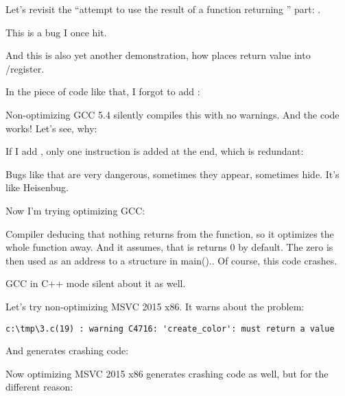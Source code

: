 \label{ForgottenReturn}

Let's revisit the ``attempt to use the result of a function returning \Tvoid'' part: .

This is a bug I once hit.

And this is also yet another demonstration, how \CCpp{} places return value into \EAX/\RAX register.

In the piece of code like that, I forgot to add :



Non-optimizing GCC 5.4 silently compiles this with no warnings.
And the code works!
Let's see, why:



If I add , only one instruction is added at the end, which is redundant:



Bugs like that are very dangerous, sometimes they appear, sometimes hide.
It's like Heisenbug.

Now I'm trying optimizing GCC:



Compiler deducing that nothing returns from the function, so it optimizes the whole function away.
And it assumes, that is returns 0 by default. The zero is then used as an address to a structure in main()..
Of course, this code crashes.

GCC in C++ mode silent about it as well.

Let's try non-optimizing MSVC 2015 x86.
It warns about the problem:

\begin{lstlisting}
c:\tmp\3.c(19) : warning C4716: 'create_color': must return a value                                                               
\end{lstlisting}

And generates crashing code:



Now optimizing MSVC 2015 x86 generates crashing code as well, but for the different reason:


